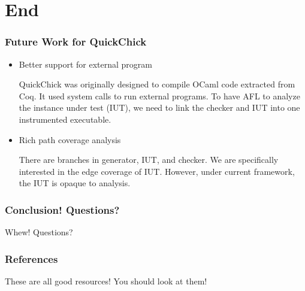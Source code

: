 \documentclass{beamer}
\begin{document}
\section{End}

\begin{frame}
  \frametitle{Future Work for QuickChick}
  \begin{itemize}
  \item Better support for external program

    QuickChick was originally designed to compile OCaml code extracted from
    Coq. It used system calls to run external programs. To have AFL to analyze
    the instance under test (IUT), we need to link the checker and IUT into one
    instrumented executable.

  \item Rich path coverage analysis

    There are branches in generator, IUT, and checker. We are specifically
    interested in the edge coverage of IUT. However, under current framework,
    the IUT is opaque to analysis.
  \end{itemize}
\end{frame}

\begin{frame}
  \frametitle{Conclusion! Questions?}

  \huge{Whew! Questions?}
\end{frame}

\begin{frame}
  \frametitle{References}

  \nocite{*}
  \printbibliography

  These are all good resources! You should look at them!
\end{frame}
\end{document}
